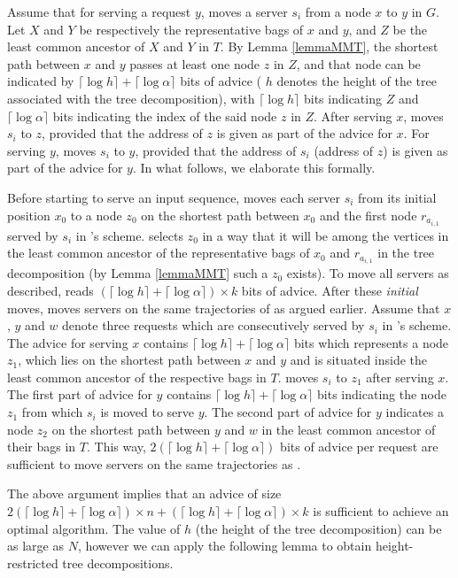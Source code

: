 Assume that for serving a request $y$, \opt moves a server $s_i$ from a node $x$ to $y$ in $G$. Let $X$ and $Y$ be respectively the representative bags of $x$ and $y$,
and $Z$ be the least common ancestor of $X$ and $Y$ in $T$.  By Lemma \ref{lemmaMMT}, the shortest path between $x$ and $y$ passes at least one node $z$ in $Z$,  and 
that node can be indicated by $\lceil \log h \rceil + \lceil \log \alpha \rceil$ bits of advice ( $h$ denotes the height of the tree associated with the tree 
decomposition), with $\lceil \log h \rceil$ bits indicating $Z$ and $\lceil \log \alpha \rceil$ bits indicating the index of the said node $z$ in $Z$. After serving $x$, \npc moves $s_i$ to $z$, provided that the address of $z$ is given as part of the advice for $x$. For serving $y$, \npc moves $s_i$ to $y$, provided that the address of $s_i$ (address of $z$) is given as part of the advice for $y$. In what follows, we elaborate this formally.

Before starting to serve an input sequence, \npc moves each server $s_i$ from its initial position $x_0$ to a node $z_0$ on the shortest path between $x_0$ and the first node $r_{a_{i,1}}$ served by $s_i$ in \opt's scheme. \npc selects $z_0$ in a way that it will be among the vertices in the least common ancestor of the representative bags of $x_0$ and $r_{a_{i,1}}$ in the tree decomposition (by Lemma \ref{lemmaMMT} such a $z_0$ exists). To move all servers as described, \npc reads $(\lceil \log h \rceil + \lceil \log \alpha \rceil) \times k$ bits of advice. After these \textit{initial} moves, \npc moves servers on the same trajectories of \opt as argued earlier. 
Assume that $x$, $y$ and $w$ denote three requests which are consecutively served by $s_i$ in \opt's scheme. The advice for serving $x$ contains $\lceil \log h \rceil + \lceil \log \alpha \rceil$ bits which represents a node $z_1$,  which lies on the shortest path between $x$ and $y$ and is situated inside the least common ancestor of the respective bags in $T$. \npc moves $s_i$ to $z_1$ after serving $x$. The first part of advice for $y$ contains $\lceil \log h \rceil + \lceil \log \alpha \rceil$ bits indicating the node $z_1$ from which $s_i$ is moved to serve $y$. The second part of advice for $y$ indicates a node $z_2$ on the shortest path between $y$ and $w$ in the least common ancestor of their bags in $T$. This way, $2 (\lceil \log h \rceil + \lceil \log \alpha \rceil)$ bits of advice per request are sufficient to move servers on the same trajectories as \opt. 

The above argument implies that an advice of size  $2 (\lceil \log h \rceil + \lceil \log \alpha \rceil) \times n + (\lceil \log h \rceil + \lceil \log \alpha \rceil) \times k$ is sufficient to achieve an optimal algorithm. The value of $h$ (the height of the tree decomposition) can be as large as $N$, 
however we can apply the following lemma to obtain height-restricted tree decompositions.

